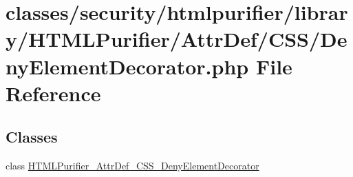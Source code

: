 \hypertarget{DenyElementDecorator_8php}{\section{classes/security/htmlpurifier/library/\+H\+T\+M\+L\+Purifier/\+Attr\+Def/\+C\+S\+S/\+Deny\+Element\+Decorator.php File Reference}
\label{DenyElementDecorator_8php}
}
\subsection*{Classes}
\begin{DoxyCompactItemize}
\item 
class \hyperlink{classHTMLPurifier__AttrDef__CSS__DenyElementDecorator}{H\+T\+M\+L\+Purifier\+\_\+\+Attr\+Def\+\_\+\+C\+S\+S\+\_\+\+Deny\+Element\+Decorator}
\end{DoxyCompactItemize}

